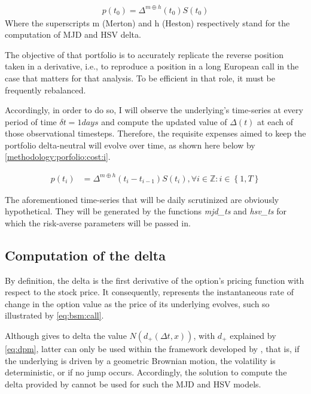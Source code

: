 \documentclass[12pt]{report}
\newcommand{\Dt}{\Delta t}
\newcommand{\N}[1]{N\left(#1\right)}
\newcommand{\dsub}[1]{d_{#1}\left(\Dt, x\right)}
\begin{document}
\begin{align}
p(t_0) = \Delta^{m \oplus h}(t_0) S(t_0) \label{methodology:porfolio:cost:0}
\end{align}
Where the superscripts m (Merton) and h (Heston) respectively stand for the computation of MJD and HSV delta.

The objective of that portfolio is to accurately replicate the reverse position taken in a derivative, i.e., to reproduce a position in a long European call in the case that matters for that analysis.
To be efficient in that role, it must be frequently rebalanced.

Accordingly, in order to do so, I will observe the underlying's time-series at every period of time $\delta t = 1 days$ and compute the updated value of $\Delta(t)$  at each of those observational timesteps.
Therefore, the requisite expenses aimed to keep the portfolio delta-neutral will evolve over time, as shown here below by \cref{methodology:porfolio:cost:i}.

\begin{align}
p(t_i) & = \Delta^{m \oplus h}(t_i - t_{i - 1}) S(t_i) 
,\forall i \in \mathbb{Z} : i \in \left \{1, T \right \}\label{methodology:porfolio:cost:i}
\end{align}

The aforementioned time-series that will be daily scrutinized are obviously hypothetical. They will be generated by the functions \textit{mjd\_ts} and \textit{hsv\_ts} for which the risk-averse parameters will be passed in.





\subsection{Computation of the delta}
\label{sec:methodology:computation:delta}

By definition, the delta is the first derivative of the option's pricing function with respect to the stock price. It consequently, represents the instantaneous rate of change in the option value as the price of its underlying evolves, such so illustrated by \cref{eq:bsm:call}.

Although \citet{bs} gives to delta the value $\N{\dsub{+}}$, with $d_{+}$ explained by \cref{eq:dpm}, latter can only be used within the framework developed by \citet{bs}, that is, if the underlying is driven by a geometric Brownian motion, the volatility is deterministic, or if no jump occurs.
Accordingly, the solution to compute the delta provided by \citet{bs} cannot be used for such the MJD and HSV models.
\end{document}
